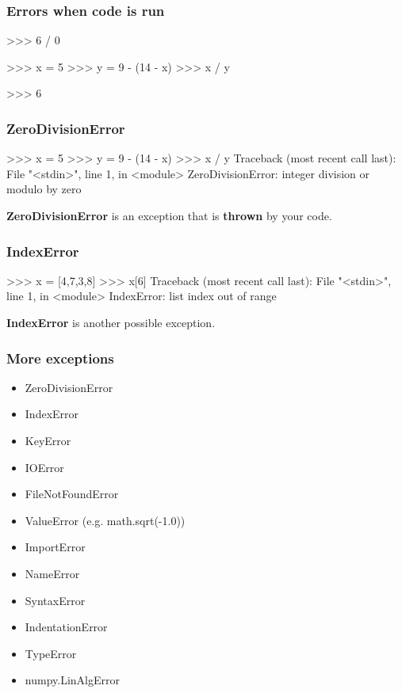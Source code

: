 \documentclass{beamer}
\begin{document}
\begin{frame}[fragile]
\frametitle{Errors when code is run}
\begin{code}
>>> 6 / 0

>>> x = 5
>>> y = 9 - (14 - x)
>>> x / y

>>> 6 %
\end{code}
\end{frame}

\begin{frame}[fragile]
\frametitle{ZeroDivisionError}
\begin{code}
>>> x = 5
>>> y = 9 - (14 - x)
>>> x / y
Traceback (most recent call last):
File "<stdin>", line 1, in <module>
ZeroDivisionError: integer division or modulo by zero
\end{code}

\bigskip

\textbf{ZeroDivisionError} is an exception that is \textbf{thrown} by your
code.
\end{frame}

\begin{frame}[fragile]
\frametitle{IndexError}
\begin{code}
>>> x = [4,7,3,8]
>>> x[6]
Traceback (most recent call last):
File "<stdin>", line 1, in <module>
IndexError: list index out of range
\end{code}
\textbf{IndexError} is another possible exception.
\end{frame}

\begin{frame}[fragile]
\frametitle{More exceptions}
\begin{itemize}
\item ZeroDivisionError
\item IndexError
\item KeyError
\item IOError
\item FileNotFoundError
\item ValueError (e.g. math.sqrt(-1.0))
\end{itemize}
\begin{itemize}
\item ImportError
\item NameError
\item SyntaxError
\item IndentationError
\item TypeError
\end{itemize}
\begin{itemize}
\item numpy.LinAlgError
\end{itemize}
\end{frame}
\end{document}
